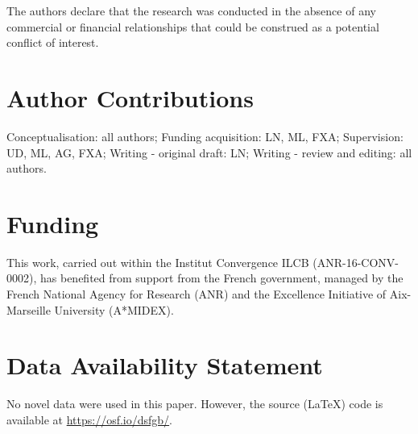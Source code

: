 \documentclass[utf8]{template/frontiersSCNS} %
\begin{document}
The authors declare that the research was conducted in the absence of any commercial or financial relationships that could be construed as a potential conflict of interest.

\section*{Author Contributions}

Conceptualisation: all authors; Funding acquisition: LN, ML, FXA; Supervision: UD, ML, AG, FXA; Writing - original draft: LN; Writing - review and editing: all authors.

\section*{Funding}

This work, carried out within the Institut Convergence ILCB (ANR-16-CONV-0002), has benefited from support from the French government, managed by the French National Agency for Research (ANR) and the Excellence Initiative of Aix-Marseille University (A*MIDEX).





\section*{Data Availability Statement}

No novel data were used in this paper. However, the source (\LaTeX) code is available at \url{https://osf.io/dsfgb/}.

\end{document}
